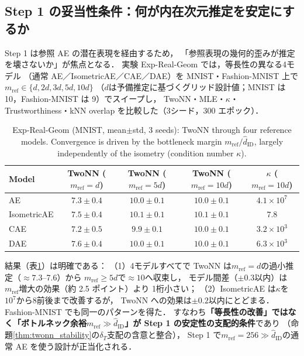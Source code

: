 \documentclass[11pt,a4paper]{jsarticle}
\newcommand{\hatdID}{\hat{d}_{\mathrm{ID}}}
\newcommand{\kap}{\kappa}
\begin{document}
\subsection{Step 1 の妥当性条件：何が内在次元推定を安定にするか}\label{sec:exp_real_geom}

Step 1 は参照 AE の潜在表現を経由するため，
「参照表現の幾何的歪みが推定を壊さないか」が焦点となる．
実験 Exp-Real-Geom では，等長性の異なる4モデル
（通常 AE／IsometricAE\cite{kato2020rdae}／CAE\cite{rifai2011cae}／DAE\cite{alain2014dae}）を
MNIST・Fashion-MNIST 上で$m_{\mathrm{ref}} \in \{d, 2d, 3d, 5d, 10d\}$
（$d$は予備推定に基づくグリッド設計値；MNIST は 10，Fashion-MNIST は 9）でスイープし，
TwoNN・MLE・$\kap$・Trustworthiness・kNN overlap を比較した（3シード，300 エポック）．

\begin{table}[H]
\centering
\caption{Exp-Real-Geom (MNIST, mean$\pm$std, 3 seeds): TwoNN through four
reference models. Convergence is driven by the bottleneck margin
$m_{\mathrm{ref}} / \hatdID$, largely independently of the isometry
(condition number $\kap$).}
\label{tab:real_geom}
\small
\begin{tabular}{lcccc}
\toprule
Model & TwoNN ($m_{\mathrm{ref}} = d$) & TwoNN ($m_{\mathrm{ref}} = 5d$) & TwoNN ($m_{\mathrm{ref}} = 10d$) & $\kap$ ($m_{\mathrm{ref}} = 10d$) \\
\midrule
AE          & $7.3 \pm 0.4$ & $10.0 \pm 0.1$ & $10.0 \pm 0.1$ & $4.1 \times 10^{7}$ \\
IsometricAE & $7.5 \pm 0.4$ & $10.1 \pm 0.1$ & $10.1 \pm 0.1$ & $7.8$ \\
CAE         & $7.2 \pm 0.5$ & $9.9 \pm 0.1$  & $10.0 \pm 0.1$ & $3.2 \times 10^{3}$ \\
DAE         & $7.6 \pm 0.4$ & $10.0 \pm 0.1$ & $10.0 \pm 0.1$ & $6.3 \times 10^{3}$ \\
\bottomrule
\end{tabular}
\end{table}

結果（表\ref{tab:real_geom}）は明確である：
（1）4モデルすべてで TwoNN は$m_{\mathrm{ref}} = d$の過小推定（$\approx 7.3$--7.6）から
$m_{\mathrm{ref}} \geq 5d$で$\approx 10$へ収束し，
モデル間差（$\pm 0.3$以内）は$m_{\mathrm{ref}}$増大の効果（約 2.5 ポイント）より
1桁小さい；
（2）IsometricAE は$\kap$を$10^{7}$から$8$前後まで改善するが，
TwoNN への効果は$\pm 0.2$以内にとどまる．
Fashion-MNIST でも同一のパターンを得た．
すなわち\textbf{「等長性の改善」ではなく「ボトルネック余裕$m_{\mathrm{ref}} \gg \hatdID$」が
Step 1 の安定性の支配的条件}であり
（命題\ref{thm:twonn_stability}の$\delta_T$支配の含意と整合），
Step 1 で$m_{\mathrm{ref}} = 256 \gg \hatdID$の通常 AE を使う設計が正当化される．
\end{document}
